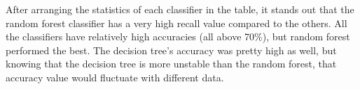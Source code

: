 \documentclass[../../main.tex]{subfiles}
\begin{document}


    After arranging the statistics of each classifier in the table, it stands out that the random forest classifier has a very high recall value compared to the others.
    All the classifiers have relatively high accuracies (all above 70\%), but random forest performed the best.
    The decision tree's accuracy was pretty high as well, but knowing that the decision tree is more unstable than the random forest, that accuracy value would fluctuate with different data.
\end{document}
